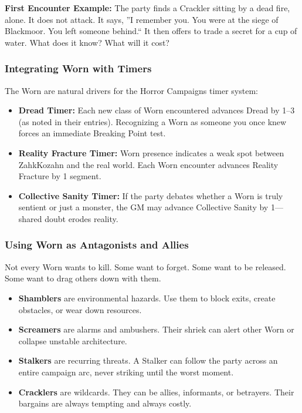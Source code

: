 \documentclass[11pt]{article}
\begin{document}
\begin{mdframed}[backgroundcolor=shadecolor]
\textbf{First Encounter Example:} The party finds a Crackler sitting by a dead fire, alone. It does not attack. It says, ''I remember you. You were at the siege of Blackmoor. You left someone behind.`` It then offers to trade a secret for a cup of water. What does it know? What will it cost?
\end{mdframed}

\subsubsection{Integrating Worn with Timers}

The Worn are natural drivers for the Horror Campaigns timer system:

\begin{itemize}
\item \textbf{Dread Timer:} Each new class of Worn encountered advances Dread by 1--3 (as noted in their entries). Recognizing a Worn as someone you once knew forces an immediate Breaking Point test.
\item \textbf{Reality Fracture Timer:} Worn presence indicates a weak spot between Zahk\textquotesingle Kozahn and the real world. Each Worn encounter advances Reality Fracture by 1 segment.
\item \textbf{Collective Sanity Timer:} If the party debates whether a Worn is truly sentient or just a monster, the GM may advance Collective Sanity by 1---shared doubt erodes reality.
\end{itemize}

\subsubsection{Using Worn as Antagonists and Allies}

Not every Worn wants to kill. Some want to forget. Some want to be released. Some want to drag others down with them.

\begin{itemize}
\item \textbf{Shamblers} are environmental hazards. Use them to block exits, create obstacles, or wear down resources.
\item \textbf{Screamers} are alarms and ambushers. Their shriek can alert other Worn or collapse unstable architecture.
\item \textbf{Stalkers} are recurring threats. A Stalker can follow the party across an entire campaign arc, never striking until the worst moment.
\item \textbf{Cracklers} are wildcards. They can be allies, informants, or betrayers. Their bargains are always tempting and always costly.
\end{itemize}
\end{document}
